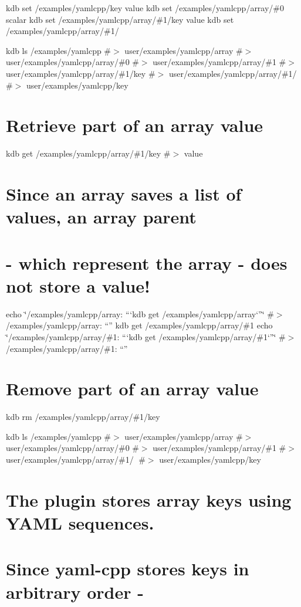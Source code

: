 kdb set /examples/yamlcpp/key value kdb set /examples/yamlcpp/array/\#0 scalar kdb set /examples/yamlcpp/array/\#1/key value kdb set /examples/yamlcpp/array/\#1/🔑 🙈

kdb ls /examples/yamlcpp \#$>$ user/examples/yamlcpp/array \#$>$ user/examples/yamlcpp/array/\#0 \#$>$ user/examples/yamlcpp/array/\#1 \#$>$ user/examples/yamlcpp/array/\#1/key \#$>$ user/examples/yamlcpp/array/\#1/🔑 \#$>$ user/examples/yamlcpp/key

\section*{Retrieve part of an array value}

kdb get /examples/yamlcpp/array/\#1/key \#$>$ value

\section*{Since an array saves a list of values, an array parent}

\section*{-\/ which represent the array -\/ does not store a value!}

echo \char`\"{}/examples/yamlcpp/array\+: “`kdb get /examples/yamlcpp/array`”\char`\"{} \#$>$ /examples/yamlcpp/array\+: “” kdb get /examples/yamlcpp/array/\#1 echo \char`\"{}/examples/yamlcpp/array/\#1\+: “`kdb get /examples/yamlcpp/array/\#1`”\char`\"{} \#$>$ /examples/yamlcpp/array/\#1\+: “”

\section*{Remove part of an array value}

kdb rm /examples/yamlcpp/array/\#1/key

kdb ls /examples/yamlcpp \#$>$ user/examples/yamlcpp/array \#$>$ user/examples/yamlcpp/array/\#0 \#$>$ user/examples/yamlcpp/array/\#1 \#$>$ user/examples/yamlcpp/array/\#1/🔑 \#$>$ user/examples/yamlcpp/key

\section*{The plugin stores array keys using Y\+A\+ML sequences.}

\section*{Since yaml-\/cpp stores keys in arbitrary order -\/}

